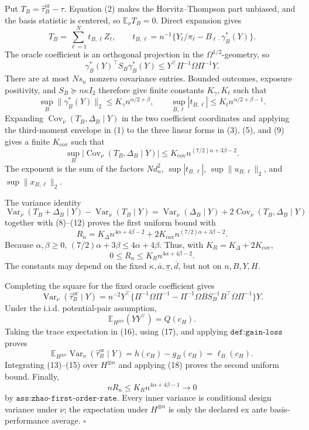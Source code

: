Put \(T_B=\widehat\tau_B^{\mathrm{or}}-\tau\).  Equation (2) makes the Horvitz--Thompson part unbiased, and the basis statistic is centered, so \(\mathbb E_\nu T_B=0\).  Direct expansion gives
\[
T_B=\sum_{\ell=1}^{N}t_{B,\ell}Z_\ell,
\qquad
t_{B,\ell}=n^{-1}\{Y_\ell/\pi_\ell-B_{\ell\cdot}\gamma_B^*(Y)\}.
\tag{9}
\]
The oracle coefficient is an orthogonal projection in the \(\Omega^{1/2}\)-geometry, so
\[
\gamma_B^*(Y)^\top S_B\gamma_B^*(Y)
\le Y^\top\Pi^{-1}\Omega\Pi^{-1}Y.
\tag{10}
\]
There are at most \(Ns_n\) nonzero covariance entries.  Bounded outcomes, exposure positivity, and \(S_B\succeq n\kappa I_2\) therefore give finite constants \(K_\gamma,K_t\) such that
\[
\sup_B\lVert\gamma_B^*(Y)\rVert_2
\le K_\gamma n^{\alpha/2+\beta},
\qquad
\sup_{B,\ell}|t_{B,\ell}|
\le K_tn^{\alpha/2+\beta-1}.
\tag{11}
\]
Expanding \(\operatorname{Cov}_\nu(T_B,\Delta_B\mid Y)\) in the two coefficient coordinates and applying the third-moment envelope in (1) to the three linear forms in (3), (5), and (9) gives a finite \(K_{\mathrm{cov}}\) such that
\[
\sup_B|\operatorname{Cov}_\nu(T_B,\Delta_B\mid Y)|
\le K_{\mathrm{cov}}n^{(7/2)\alpha+3\beta-2}.
\tag{12}
\]
The exponent is the sum of the factors \(Nd_n^2\), \(\sup|t_{B,\ell}|\), \(\sup\lVert u_{B,\ell}\rVert_2\), and \(\sup\lVert x_{B,\ell}\rVert_2\).

The variance identity
\[
\operatorname{Var}_\nu(T_B+\Delta_B\mid Y)-\operatorname{Var}_\nu(T_B\mid Y)
=\operatorname{Var}_\nu(\Delta_B\mid Y)+2\operatorname{Cov}_\nu(T_B,\Delta_B\mid Y)
\tag{13}
\]
together with (8)--(12) proves the first uniform bound with
\[
R_n=K_\Delta n^{4\alpha+4\beta-2}
+2K_{\mathrm{cov}}n^{(7/2)\alpha+3\beta-2}.
\tag{14}
\]
Because \(\alpha,\beta\ge0\), \((7/2)\alpha+3\beta\le4\alpha+4\beta\).  Thus, with \(K_R=K_\Delta+2K_{\mathrm{cov}}\),
\[
0\le R_n\le K_Rn^{4\alpha+4\beta-2}.
\tag{15}
\]
The constants may depend on the fixed \(\kappa,\overline a,\underline\pi,\overline d\), but not on \(n,B,Y,H\).

Completing the square for the fixed oracle coefficient gives
\[
\operatorname{Var}_\nu(\widehat\tau_B^{\mathrm{or}}\mid Y)
=n^{-2}Y^\top\{\Pi^{-1}\Omega\Pi^{-1}
-\Pi^{-1}\Omega BS_B^{-1}B^\top\Omega\Pi^{-1}\}Y.
\tag{16}
\]
Under the i.i.d. potential-pair assumption,
\[
\mathbb E_{H^{\otimes n}}(YY^\top)=Q(c_H).
\tag{17}
\]
Taking the trace expectation in (16), using (17), and applying \(\texttt{def:gain-loss}\) proves
\[
\mathbb E_{H^{\otimes n}}
\operatorname{Var}_\nu(\widehat\tau_B^{\mathrm{or}}\mid Y)
=h(c_H)-g_B(c_H)=\ell_B(c_H).
\tag{18}
\]
Integrating (13)--(15) over \(H^{\otimes n}\) and applying (18) proves the second uniform bound.  Finally,
\[
nR_n\le K_Rn^{4\alpha+4\beta-1}\longrightarrow0
\]
by \(\texttt{ass:zhao-first-order-rate}\).  Every inner variance is conditional design variance under \(\nu\); the expectation under \(H^{\otimes n}\) is only the declared ex ante basis-performance average. \(\square\)